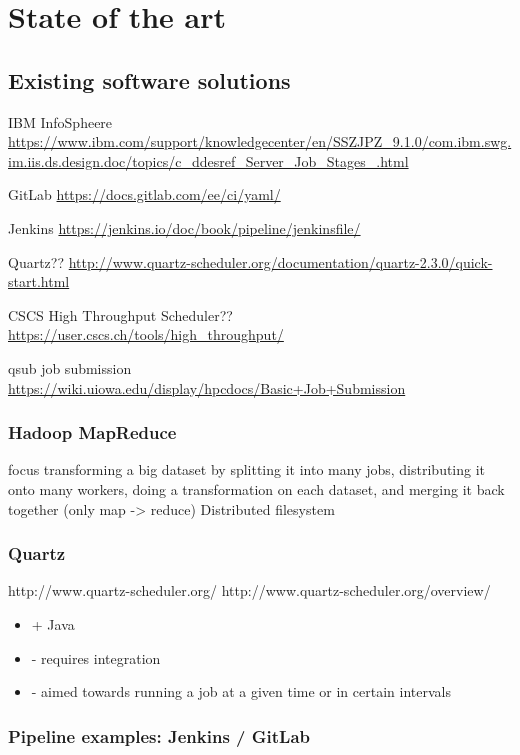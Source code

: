 \chapter{State of the art}

\section{Existing software solutions}

IBM InfoSpheere \url{https://www.ibm.com/support/knowledgecenter/en/SSZJPZ_9.1.0/com.ibm.swg.im.iis.ds.design.doc/topics/c_ddesref_Server_Job_Stages_.html}

GitLab \url{https://docs.gitlab.com/ee/ci/yaml/}

Jenkins \url{https://jenkins.io/doc/book/pipeline/jenkinsfile/}

Quartz?? \url{http://www.quartz-scheduler.org/documentation/quartz-2.3.0/quick-start.html}

CSCS High Throughput Scheduler?? \url{https://user.cscs.ch/tools/high_throughput/}


qsub job submission \url{https://wiki.uiowa.edu/display/hpcdocs/Basic+Job+Submission}



\subsection{Hadoop MapReduce}

focus transforming a big dataset by splitting it into many jobs, distributing it onto many workers, doing a transformation on each dataset, and merging it back together (only map -> reduce)
Distributed filesystem

\subsection{Quartz}

http://www.quartz-scheduler.org/
http://www.quartz-scheduler.org/overview/

\begin{itemize}
	\item + Java
	\item - requires integration
	\item - aimed towards running a job at a given time or in certain intervals
\end{itemize}

\subsection{Pipeline examples: Jenkins / GitLab}

